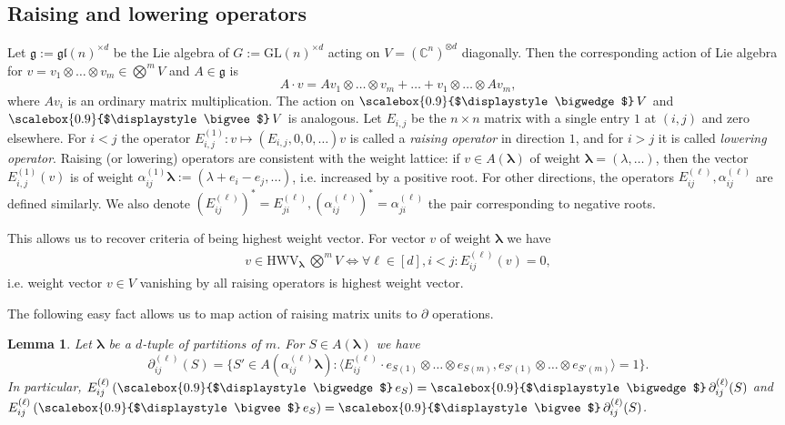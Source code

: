 \documentclass[12pt, reqno]{amsart}
\newtheorem{lemma}[theorem]{Lemma}
\theoremstyle{definition}
\let\oldbigwedge\bigwedge
\let\oldbigvee\bigvee
\renewcommand{\bigwedge}{
  \mathop{
    \vcenter{
      \hbox{\scalebox{0.9}{$\displaystyle\oldbigwedge$}}
    }
  }
}
\renewcommand{\bigvee}{
  \mathop{
    \vcenter{
      \hbox{\scalebox{0.9}{$\displaystyle\oldbigvee$}}
    }
  }
}
\begin{document}
\subsection{Raising and lowering operators}
Let $\mathfrak{g}:= \mathfrak{gl}(n)^{\times d}$ be the Lie algebra of $G:= \mathrm{GL}(n)^{\times d}$ acting on $V =(\mathbb{C}^n)^{\otimes d}$ diagonally. Then the corresponding action of Lie algebra for $v = v_1 \otimes\ldots\otimes v_m \in \bigotimes^m V$ and $A \in \mathfrak{g}$ is
$$
    A \cdot v = A v_1 \otimes\ldots\otimes v_m + \ldots + v_1 \otimes\ldots\otimes Av_m,
$$
where $Av_i$ is an ordinary matrix multiplication. The action on $\bigwedge V$ and $\bigvee V$ is analogous. 
Let $E_{i,j}$ be the $n \times n$ matrix with a single entry $1$  at $(i,j)$ and zero elsewhere. For $i < j$ the operator $E^{(1)}_{i,j}: v \mapsto (E_{i,j},0,0,\ldots) v$ is called a {\it raising operator} in direction $1$, and for $i > j$ it is called \textit{lowering operator}. Raising (or lowering) operators are consistent with the weight lattice: if $v \in A(\pmb{\lambda})$ of weight $\pmb{\lambda} = (\lambda,\ldots)$, then the vector $E^{(1)}_{i,j}(v)$ is of weight 
$\alpha^{(1)}_{ij}\pmb{\lambda} := (\lambda+e_i-e_j,\ldots)$,
i.e. increased by a positive root.
For other directions, the operators $E^{(\ell)}_{ij}, \alpha^{(\ell)}_{ij}$ are defined similarly. 
We also denote $(E^{(\ell)}_{ij})^* = E_{ji}^{(\ell)}, (\alpha^{(\ell)}_{ij})^* = \alpha_{ji}^{(\ell)}$ the pair corresponding to negative roots. 

This allows us to recover criteria of being highest weight vector. For vector $v$ of weight $\pmb{\lambda}$ we have
\begin{align}\label{eq:hwv-def1}
    v \in \mathrm{HWV}_{\pmb{\lambda}}~ \bigotimes^m V \iff \forall \ell \in [d], i < j: E^{(\ell)}_{i j}(v) = 0,
\end{align}
i.e. weight vector $v \in V$ vanishing by all raising operators is highest weight vector.

\vspace{0.5em}

The following easy fact allows us to map action of raising matrix units to $\partial$ operations.

\begin{lemma}\label{lemma:eij-action}
    Let $\pmb{\lambda}$ be a $d$-tuple of partitions of $m$. For %
    $S \in A(\pmb{\lambda})$ we have %
    $$
    \partial^{(\ell)}_{i j}(S) = \{S' \in A(\alpha^{(\ell)}_{i j} \pmb{\lambda}): \langle E^{(\ell)}_{i j} \cdot e_{S(1)}\otimes\ldots\otimes e_{S(m)}, e_{S'(1)}\otimes\ldots\otimes e_{S'(m)} \rangle = 1 \}.
    $$
    In particular, $E^{(\ell)}_{ij}\left(\bigwedge e_S\right) = \bigwedge \partial^{(\ell)}_{ij}(S)$ and $E^{(\ell)}_{ij}\left(\bigvee e_S\right) = \bigvee \partial^{(\ell)}_{ij}(S)$.
\end{lemma}
\end{document}
